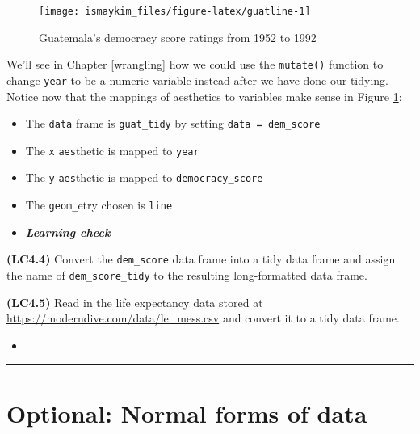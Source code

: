 \documentclass[12pt,]{krantz}
\providecommand{\tightlist}{%
  \setlength{\itemsep}{0pt}\setlength{\parskip}{0pt}}
\newenvironment{rmdblock}[1]
  {\begin{shaded*}
  \begin{itemize}
  \renewcommand{\labelitemi}{
    \raisebox{-.7\height}[0pt][0pt]{
    }
  }
  \item
  }
  {
  \end{itemize}
  \end{shaded*}
  }
\newenvironment{learncheck}
  {\begin{rmdblock}{warning}}
  {\end{rmdblock}}
\theoremstyle{definition}
\theoremstyle{definition}
\theoremstyle{definition}
\theoremstyle{remark}
\begin{document}
\begin{figure}

{\centering \texttt{[image: ismaykim\_files/figure-latex/guatline-1]} 

}

\caption{Guatemala's democracy score ratings from 1952 to 1992}\label{fig:guatline}
\end{figure}

We'll see in Chapter \ref{wrangling} how we could use the
\texttt{mutate()} function to change \texttt{year} to be a numeric
variable instead after we have done our tidying. Notice now that the
mappings of aesthetics to variables make sense in Figure
\ref{fig:guatline}:

\begin{itemize}
\tightlist
\item
  The \texttt{data} frame is \texttt{guat\_tidy} by setting
  \texttt{data\ =\ dem\_score}
\item
  The \texttt{x} \texttt{aes}thetic is mapped to \texttt{year}
\item
  The \texttt{y} \texttt{aes}thetic is mapped to
  \texttt{democracy\_score}
\item
  The \texttt{geom\_}etry chosen is \texttt{line}
\end{itemize}

\begin{learncheck}
\textbf{\emph{Learning check}}
\end{learncheck}

\textbf{(LC4.4)} Convert the \texttt{dem\_score} data frame into a tidy
data frame and assign the name of \texttt{dem\_score\_tidy} to the
resulting long-formatted data frame.

\textbf{(LC4.5)} Read in the life expectancy data stored at
\url{https://moderndive.com/data/le_mess.csv} and convert it to a tidy
data frame.

\begin{learncheck}

\end{learncheck}

\begin{center}\rule{0.5\linewidth}{\linethickness}\end{center}

\section{Optional: Normal forms of
data}\label{optional-normal-forms-of-data}
\end{document}
